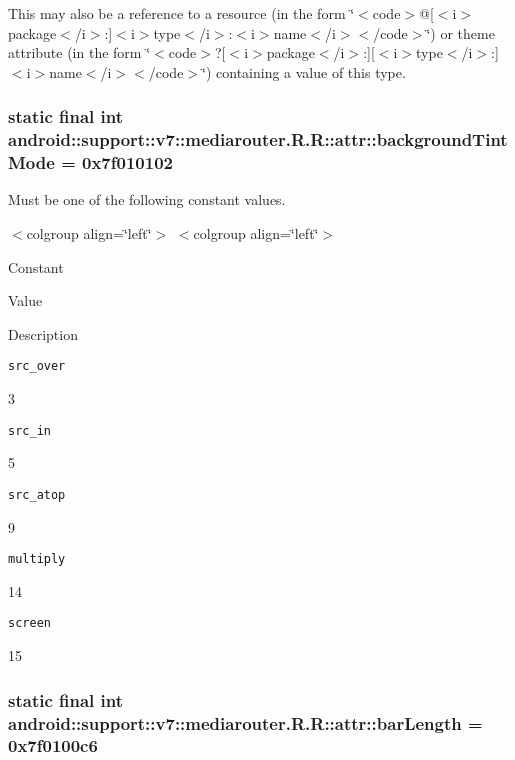 This may also be a reference to a resource (in the form \char`\"{}$<$code$>$@\mbox{[}$<$i$>$package$<$/i$>$:\mbox{]}$<$i$>$type$<$/i$>$:$<$i$>$name$<$/i$>$$<$/code$>$\char`\"{}) or theme attribute (in the form \char`\"{}$<$code$>$?\mbox{[}$<$i$>$package$<$/i$>$:\mbox{]}\mbox{[}$<$i$>$type$<$/i$>$:\mbox{]}$<$i$>$name$<$/i$>$$<$/code$>$\char`\"{}) containing a value of this type. \hypertarget{classandroid_1_1support_1_1v7_1_1mediarouter_1_1_r_1_1attr_849cdc5f356a27c4255b452f0f20dd9c}{
\subsubsection[{backgroundTintMode}]{\setlength{\rightskip}{0pt plus 5cm}static final int android::support::v7::mediarouter.R.R::attr::backgroundTintMode = 0x7f010102}}
\label{classandroid_1_1support_1_1v7_1_1mediarouter_1_1_r_1_1attr_849cdc5f356a27c4255b452f0f20dd9c}


Must be one of the following constant values. \begin{TabularC}{0}
\hline
\end{TabularC}
$<$colgroup align=\char`\"{}left\char`\"{}$>$ $<$colgroup align=\char`\"{}left\char`\"{}$>$ 

Constant

Value

Description 

{\tt src\_\-over}

3

{\tt src\_\-in}

5

{\tt src\_\-atop}

9

{\tt multiply}

14

{\tt screen}

15\hypertarget{classandroid_1_1support_1_1v7_1_1mediarouter_1_1_r_1_1attr_45e5cce3e0fdce7f2c53217fc654a608}{
\subsubsection[{barLength}]{\setlength{\rightskip}{0pt plus 5cm}static final int android::support::v7::mediarouter.R.R::attr::barLength = 0x7f0100c6}}
\label{classandroid_1_1support_1_1v7_1_1mediarouter_1_1_r_1_1attr_45e5cce3e0fdce7f2c53217fc654a608}


